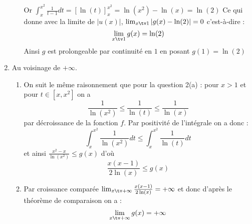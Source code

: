 \begin{correction}
\begin{enumerate}
\begin{enumerate}
Or $\int_x^{x^2} \frac{1}{t-1}dt = [\ln(t)]_x^{x^2} = \ln(x^2) -\ln(x) =\ln(2)$
Ce qui donne avec la limite de $|u(x)|$, $\lim_{x\tv 1} |g(x)-\ln(2)| =0$ 
c'est-à-dire :
$$\lim_{x\tv 1} g(x) =\ln(2)$$
Ainsi $g$ est prolongeable par continuité en $1$ en posant $g(1)  = \ln(2)$ 

\end{enumerate}
\item Au voisinage de $+\infty$. 
\begin{enumerate}
\item On suit le même raisonnement que pour la question 2(a) : pour $x>1$ et pour $t\in [x,x^2]$ on a 
$$\frac{1}{\ln(x^2)} \leq \frac{1}{\ln(t)}\leq \frac{1}{\ln(x)}$$
par décroissance de la fonction $f$. 
Par positivité de l'intégrale on a donc :
$$\int_x^{x^2} \frac{1}{\ln(x^2)} dt \leq\int_x^{x^2}  \frac{1}{\ln(t)}dt$$
et ainsi 
$\frac{x^2-x}{\ln(x^2)}\leq g(x)$
d'où 
$$\frac{x(x-1)}{2\ln(x)}\leq g(x)$$

\item Par croissance comparée $\lim_{x\tv +\infty} \frac{x(x-1)}{2\ln(x)}= +\infty$ et donc d'après le théorème de comparaison on a : 
$$\lim_{x\tv +\infty}g(x) =+\infty$$


\end{enumerate}


\end{enumerate}
\end{correction}
